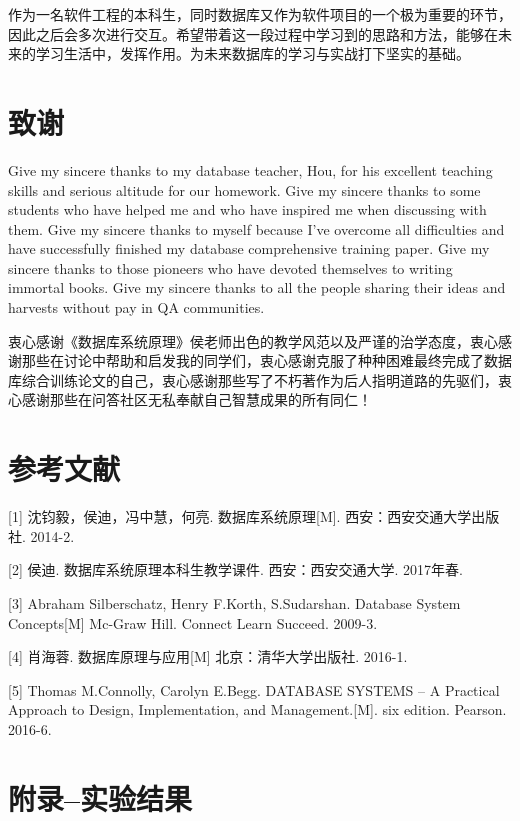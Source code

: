 \documentclass[UTF8]{ctexart}
\begin{document}
    作为一名软件工程的本科生，同时数据库又作为软件项目的一个极为重要的环节，因此之后会多次进行交互。希望带着这一段过程中学习到的思路和方法，能够在未来的学习生活中，发挥作用。为未来数据库的学习与实战打下坚实的基础。

    \section{致谢}
    Give my sincere thanks to my database teacher, Hou, for his excellent teaching skills and serious altitude for our homework. Give my sincere thanks to some students who have helped me and who have inspired me when discussing with them. Give my sincere thanks to myself because I've overcome all difficulties and have successfully finished my database comprehensive training paper. Give my sincere thanks to those pioneers who have devoted themselves to writing immortal books. Give my sincere thanks to all the people sharing their ideas and harvests without pay in QA communities.

    衷心感谢《数据库系统原理》侯老师出色的教学风范以及严谨的治学态度，衷心感谢那些在讨论中帮助和启发我的同学们，衷心感谢克服了种种困难最终完成了数据库综合训练论文的自己，衷心感谢那些写了不朽著作为后人指明道路的先驱们，衷心感谢那些在问答社区无私奉献自己智慧成果的所有同仁！

    \section{参考文献}
    [1] 沈钧毅，侯迪，冯中慧，何亮. 数据库系统原理[M]. 西安：西安交通大学出版社. 2014-2.

    [2] 侯迪. 数据库系统原理本科生教学课件. 西安：西安交通大学. 2017年春.

    [3] Abraham Silberschatz, Henry F.Korth, S.Sudarshan. Database System Concepts[M] Mc-Graw Hill. Connect Learn Succeed. 2009-3.

    [4] 肖海蓉. 数据库原理与应用[M] 北京：清华大学出版社. 2016-1.

    [5] Thomas M.Connolly, Carolyn E.Begg. DATABASE SYSTEMS -- A Practical Approach to Design, Implementation, and Management.[M]. six edition. Pearson. 2016-6.

    \section{附录--实验结果}
\end{document}
